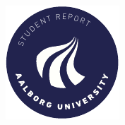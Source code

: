 \begin{titlepage}
{{\begin{tabular}{@{}p{\textwidth}@{}}
  \end{tabular}}}
  \vfill
  \begin{center}
    \includegraphics[width=0.2\paperwidth]{Images/aau_logo_circle_en}
  \end{center}
\end{titlepage}
\clearpage